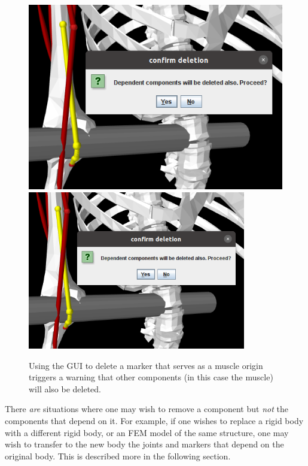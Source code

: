 \begin{figure}[ht]
\begin{center}
   \iflatexml 
      \includegraphics[]{images/deletingMarkerInGui} 
   \else 
      \includegraphics[width=3.75in]{images/deletingMarkerInGui} 
   \fi
\end{center}
\caption{Using the GUI to delete a marker that serves as a muscle origin
triggers a warning that other components (in this case the muscle) will also be
deleted.}
\label{deletingMarkerInGui:fig}
\end{figure}

There {\it are} situations where one may wish to remove a component but {\it
not} the components that depend on it. For example, if one wishes to replace a
rigid body with a different rigid body, or an FEM model of the same structure,
one may wish to transfer to the new body the joints and markers that depend on
the original body. This is described more in the following section.

